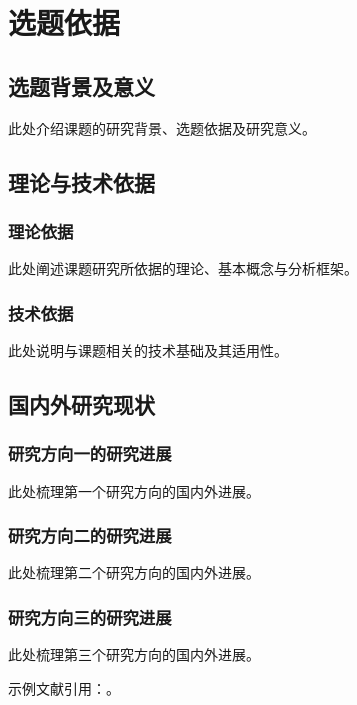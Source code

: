 \chapter{选题依据}

\section{选题背景及意义}
此处介绍课题的研究背景、选题依据及研究意义。

\section{理论与技术依据}
\subsection{理论依据}
此处阐述课题研究所依据的理论、基本概念与分析框架。

\subsection{技术依据}
此处说明与课题相关的技术基础及其适用性。

\section{国内外研究现状}
\subsection{研究方向一的研究进展}
此处梳理第一个研究方向的国内外进展。

\subsection{研究方向二的研究进展}
此处梳理第二个研究方向的国内外进展。

\subsection{研究方向三的研究进展}
此处梳理第三个研究方向的国内外进展。

示例文献引用：\cite{latexproject}。
